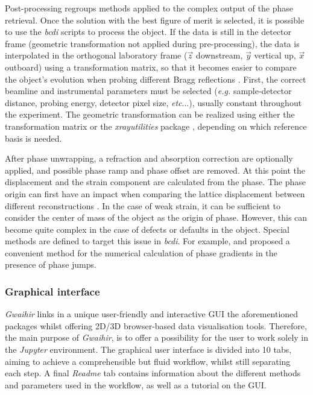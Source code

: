 Post-processing regroups methods applied to the complex output of the phase retrieval.
Once the solution with the best figure of merit is selected, it is possible to use the \textit{bcdi} scripts to process the object.
If the data is still in the detector frame (geometric transformation not applied during pre-processing), the data is interpolated in the orthogonal laboratory frame ($\vec{z}$ downstream, $\vec{y}$ vertical up, $\vec{x}$ outboard) using a transformation matrix, so that it becomes easier to compare the object's evolution when probing different Bragg reflections \parencite{Lauraux2021}.
First, the correct beamline and instrumental parameters must be selected (\textit{e.g.} sample-detector distance, probing energy, detector pixel size, \textit{etc}...), usually constant throughout the experiment.
The geometric transformation can be realized using either the transformation matrix \parencite{thesismark} or the \textit{xrayutilities} package \parencite{kriegner_xrayutilities_2013}, depending on which reference basis is needed.

After phase unwrapping, a refraction and absorption correction are optionally applied, and possible phase ramp and phase offset are removed.
At this point the displacement and the strain component are calculated from the phase.
The phase origin can first have an impact when comparing the lattice displacement between different reconstructions \parencite{Atlan2023}.
In the case of weak strain, it can be sufficient to consider the center of mass of the object as the origin of phase.
However, this can become quite complex in the case of defects or defaults in the object.
Special methods are defined to target this issue in \textit{bcdi}.
For example, \cite{guizar-sicairos_phase_2011} and \cite{hofmann_nanoscale_2020} proposed a convenient method for the numerical calculation of phase gradients in the presence of phase jumps.

\subsubsection{Graphical interface}

\textit{Gwaihir} links in a unique user-friendly and interactive GUI the aforementioned packages whilst offering 2D/3D browser-based data visualisation tools.
Therefore, the main purpose of \textit{Gwaihir}, is to offer a possibility for the user to work solely in the \textit{Jupyter} environment.
The graphical user interface is divided into 10 tabs, aiming to achieve a comprehensible but fluid workflow, whilst still separating each step.
A final \textit{Readme} tab contains information about the different methods and parameters used in the workflow, as well as a tutorial on the GUI.

